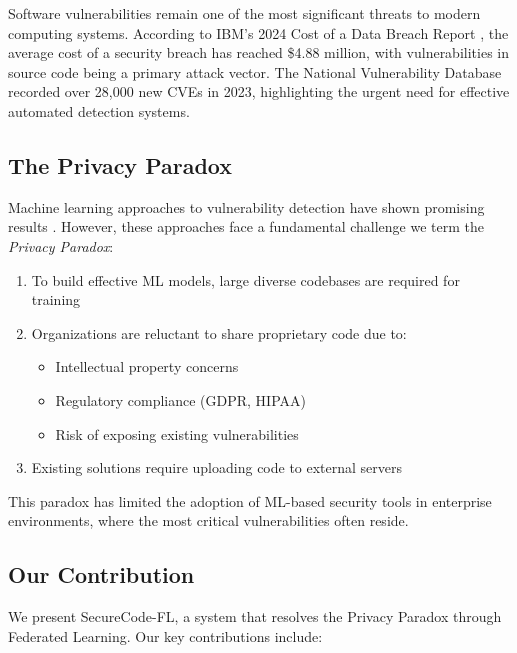 \documentclass[conference]{IEEEtran}
\begin{document}
Software vulnerabilities remain one of the most significant threats to modern computing systems. According to IBM's 2024 Cost of a Data Breach Report \cite{ibm2024}, the average cost of a security breach has reached \$4.88 million, with vulnerabilities in source code being a primary attack vector. The National Vulnerability Database \cite{nist2024} recorded over 28,000 new CVEs in 2023, highlighting the urgent need for effective automated detection systems.

\subsection{The Privacy Paradox}

Machine learning approaches to vulnerability detection have shown promising results \cite{zhou2019devign, li2018vuldeepecker, fu2022linevul}. However, these approaches face a fundamental challenge we term the \textit{Privacy Paradox}:

\begin{enumerate}
    \item To build effective ML models, large diverse codebases are required for training
    \item Organizations are reluctant to share proprietary code due to:
    \begin{itemize}
        \item Intellectual property concerns
        \item Regulatory compliance (GDPR, HIPAA)
        \item Risk of exposing existing vulnerabilities
    \end{itemize}
    \item Existing solutions require uploading code to external servers
\end{enumerate}

This paradox has limited the adoption of ML-based security tools in enterprise environments, where the most critical vulnerabilities often reside.

\subsection{Our Contribution}

We present SecureCode-FL, a system that resolves the Privacy Paradox through Federated Learning. Our key contributions include:
\end{document}
